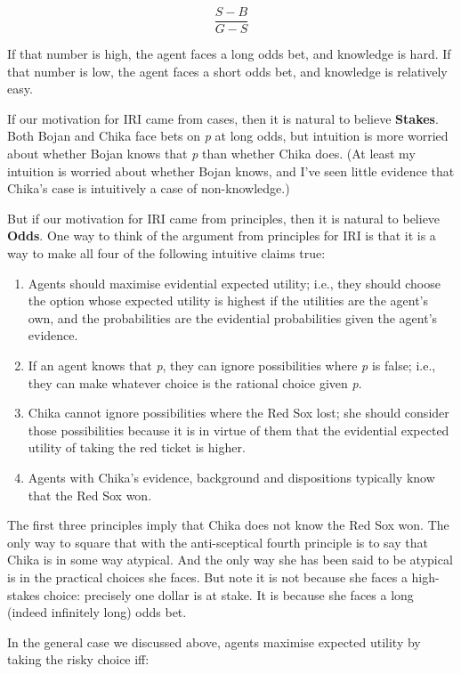 \documentclass[
  10pt,
  letterpaper,
  DIV=11,
  numbers=noendperiod,
  twoside]{scrartcl}
\providecommand{\tightlist}{%
  \setlength{\itemsep}{0pt}\setlength{\parskip}{0pt}}\usepackage{longtable,booktabs,array}
\begin{document}
\[
\frac{S-B}{G-S}
\]

If that number is high, the agent faces a long odds bet, and knowledge
is hard. If that number is low, the agent faces a short odds bet, and
knowledge is relatively easy.

If our motivation for IRI came from cases, then it is natural to believe
\textbf{Stakes}. Both Bojan and Chika face bets on \emph{p} at long
odds, but intuition is more worried about whether Bojan knows that
\emph{p} than whether Chika does. (At least my intuition is worried
about whether Bojan knows, and I've seen little evidence that Chika's
case is intuitively a case of non-knowledge.)

But if our motivation for IRI came from principles, then it is natural
to believe \textbf{Odds}. One way to think of the argument from
principles for IRI is that it is a way to make all four of the following
intuitive claims true:

\begin{enumerate}
\def\labelenumi{\arabic{enumi}.}
\tightlist
\item
  Agents should maximise evidential expected utility; i.e., they should
  choose the option whose expected utility is highest if the utilities
  are the agent's own, and the probabilities are the evidential
  probabilities given the agent's evidence.
\item
  If an agent knows that \emph{p}, they can ignore possibilities where
  \emph{p} is false; i.e., they can make whatever choice is the rational
  choice given \emph{p}.
\item
  Chika cannot ignore possibilities where the Red Sox lost; she should
  consider those possibilities because it is in virtue of them that the
  evidential expected utility of taking the red ticket is higher.
\item
  Agents with Chika's evidence, background and dispositions typically
  know that the Red Sox won.
\end{enumerate}

The first three principles imply that Chika does not know the Red Sox
won. The only way to square that with the anti-sceptical fourth
principle is to say that Chika is in some way atypical. And the only way
she has been said to be atypical is in the practical choices she faces.
But note it is not because she faces a high-stakes choice: precisely one
dollar is at stake. It is because she faces a long (indeed infinitely
long) odds bet.

In the general case we discussed above, agents maximise expected utility
by taking the risky choice iff:
\end{document}

